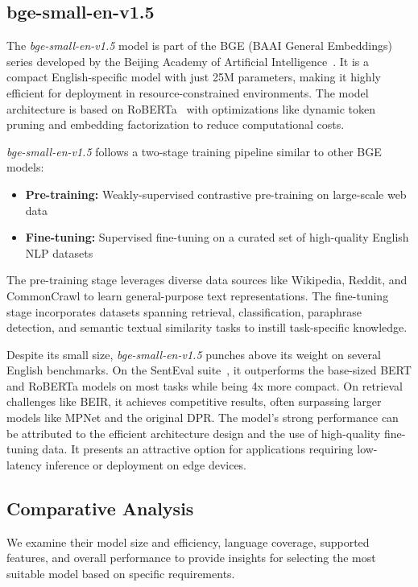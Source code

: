 \subsection{bge-small-en-v1.5}\label{subsec:baai}
The \textit{\textit{bge-small-en-v1.5}} model is part of the BGE (BAAI General Embeddings) series developed by the Beijing Academy of Artificial Intelligence~\cite{bge_embedding}.
It is a compact English-specific model with just 25M parameters, making it highly efficient for deployment in resource-constrained environments.
The model architecture is based on RoBERTa~\cite{liu2019robertarobustlyoptimizedbert} with optimizations like dynamic token pruning and embedding factorization to reduce computational costs.

\textit{\textit{bge-small-en-v1.5}} follows a two-stage training pipeline similar to other BGE models:
\begin{itemize}
    \item \textbf{Pre-training:} Weakly-supervised contrastive pre-training on large-scale web data
    \item \textbf{Fine-tuning:} Supervised fine-tuning on a curated set of high-quality English NLP datasets
\end{itemize}

The pre-training stage leverages diverse data sources like Wikipedia, Reddit, and CommonCrawl to learn general-purpose text representations. The fine-tuning stage incorporates datasets spanning retrieval, classification, paraphrase detection, and semantic textual similarity tasks to instill task-specific knowledge.

Despite its small size, \textit{\textit{bge-small-en-v1.5}} punches above its weight on several English benchmarks.
On the SentEval suite~\cite{conneau2018senteval}, it outperforms the base-sized BERT and RoBERTa models on most tasks while being 4x more compact.
On retrieval challenges like BEIR, it achieves competitive results, often surpassing larger models like MPNet and the original DPR.
The model's strong performance can be attributed to the efficient architecture design and the use of high-quality fine-tuning data.
It presents an attractive option for applications requiring low-latency inference or deployment on edge devices.

\subsection{Comparative Analysis}\label{subsec:comparative-analysis}
We examine their model size and efficiency, language coverage, supported features, and overall performance to provide insights for selecting the most suitable model based on specific requirements.

